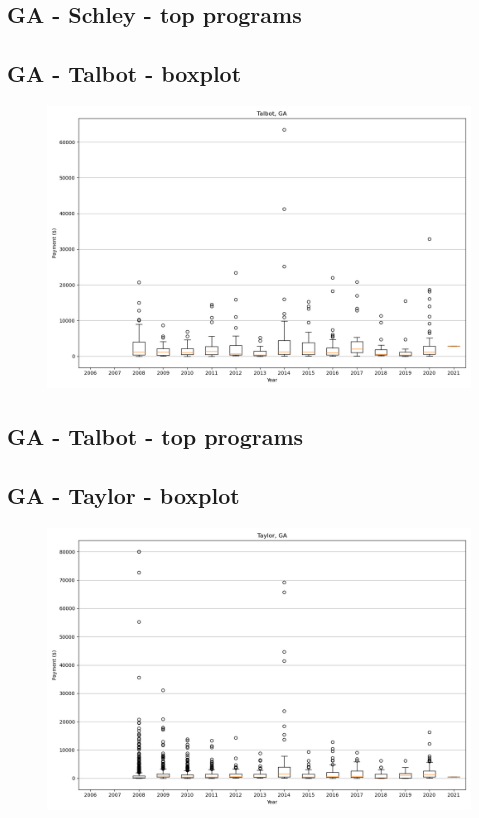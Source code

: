 \subsection*{GA - Schley - top programs}

\newpage
\subsection*{GA - Talbot - boxplot}
\begin{figure}[h]
\centering
\includegraphics[width=7in]{../output/boxplots/counties/Talbot-GA_boxplot.png}
\end{figure}


\subsection*{GA - Talbot - top programs}

\newpage
\subsection*{GA - Taylor - boxplot}
\begin{figure}[h]
\centering
\includegraphics[width=7in]{../output/boxplots/counties/Taylor-GA_boxplot.png}
\end{figure}


